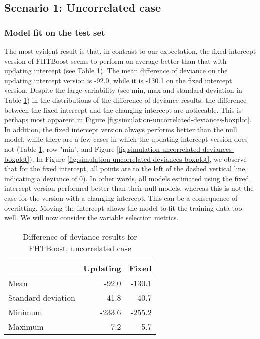 \subsection{Scenario 1: Uncorrelated case}
\subsubsection{Model fit on the test set}
The most evident result is that, in contrast to our expectation, the fixed intercept version of FHTBoost seems to perform on average better than that with updating intercept (see Table \ref{table:uncorrelated-deviance}).
The mean difference of deviance on the updating intercept version is -92.0, while it is -130.1 on the fixed intercept version.
Despite the large variability (see min, max and standard deviation in Table \ref{table:uncorrelated-deviance}) in the distributions of the difference of deviance results, the difference between the fixed intercept and the changing intercept are noticeable.
This is perhaps most apparent in Figure \ref{fig:simulation-uncorrelated-deviances-boxplot}.
In addition, the fixed intercept version always performs better than the null model, while there are a few cases in which the updating intercept version does not (Table \ref{table:uncorrelated-deviance}, row "min", and Figure \ref{fig:simulation-uncorrelated-deviances-boxplot}).
In Figure \ref{fig:simulation-uncorrelated-deviances-boxplot}, we observe that for the fixed intercept, all points are to the left of the dashed vertical line, indicating a deviance of 0).
In other words, all models estimated using the fixed intercept version performed better than their null models, whereas this is not the case for the version with a changing intercept.
This can be a consequence of overfitting.
Moving the intercept allows the model to fit the training data too well.
We will now consider the variable selection metrics.

\begin{table}
\caption{Difference of deviance results for FHTBoost, uncorrelated case}
\label{table:uncorrelated-deviance}
\centering
\begin{tabular}{l|rr}
\toprule
& Updating & Fixed \\
\hline
Mean               &  -92.0  & -130.1  \\
Standard deviation &   41.8  &   40.7  \\
Minimum            & -233.6  & -255.2  \\
Maximum            &    7.2  &   -5.7  \\
\bottomrule
\end{tabular}
\end{table}

